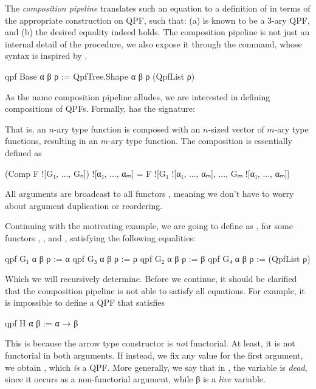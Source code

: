 The \emph{composition pipeline} translates such an equation to a definition of  in terms of the appropriate construction on QPF, such that: (a)  is known to be a 3-ary QPF, and (b) the desired equality indeed holds.
The composition pipeline is not just an internal detail of the procedure, we also expose it through the \qpf{} command, whose syntax is inspired by .
\begin{leancode}
  qpf Base α β ρ := QpfTree.Shape α β ρ (QpfList ρ)
\end{leancode}



As the name composition pipeline alludes, we are interested in defining compositions of QPFs. Formally,  has the signature:
\begin{center}
\end{center}
That is, an $n$-ary type function  is composed with an $n$-sized vector of $m$-ary type functions, resulting in an $m$-ary type function. The composition is essentially defined as
\begin{leancode}
    (Comp F ![G₁, ..., Gₙ]) ![α₁, ..., αₘ] 
                = F ![G₁ ![α₁, ..., αₘ], ..., Gₘ ![α₁, ..., αₘ]]
\end{leancode}
All arguments  are broadcast to all functors , meaning we don't have to worry about argument duplication or reordering.

Continuing with the motivating example, we are going to define  as , for some functors , ,  and , satisfying the following equalities:
\begin{leancode}
  qpf G₁ α β ρ := α                qpf G₃ α β ρ := ρ
  qpf G₂ α β ρ := β                qpf G₄ α β ρ := (QpfList ρ)
\end{leancode}

Which we will recursively determine.
Before we continue, it should be clarified that the composition pipeline is not able to satisfy all 
equations. For example, it is impossible to define a QPF that satisfies
\begin{badleancode}
  qpf H α β := α → β 
\end{badleancode}
This is because the arrow type constructor  is \emph{not} functorial. 
At least, it is not functorial in both arguments. If instead, we fix any value  for the
first argument, we obtain , which \emph{is} a QPF.\@
More generally, we say that in , the variable  is \emph{dead}, since it occurs as a non-functorial argument, while β is a \emph{live} variable.

